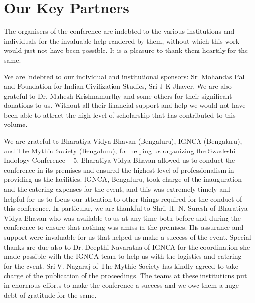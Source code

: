 
\chapter*{Our Key Partners}\label{keypartners}

\vspace{-.5cm}

The organisers of the conference are indebted to the various institutions and individuals for the invaluable help rendered by them, without which this work would just not have been possible. It is a pleasure to thank them heartily for the same.

We are indebted to our individual and institutional sponsors: Sri Mohandas Pai and Foundation for Indian Civilization Studies, Sri J K Jhaver. We are also grateful to Dr. Mahesh Krishnamurthy and some others for their significant donations to us. Without all their financial support and help we would not have been able to attract the high level of scholarship that has contributed to this volume.

We are grateful to Bharatiya Vidya Bhavan (Bengaluru), IGNCA (Bengaluru), and The Mythic Society (Bengaluru), for helping us organizing the Swadeshi Indology Conference – 5. Bharatiya Vidya Bhavan allowed us to conduct the conference in its premises and ensured the highest level of professionalism in providing us the facilities. IGNCA, Bengaluru, took charge of the inauguration and the catering expenses for the event, and this was extremely timely and helpful for us to focus our attention to other things required for the conduct of this conference. In particular, we are thankful to Shri. H. N. Suresh of Bharatiya Vidya Bhavan who was available to us at any time both before and during the conference to ensure that nothing was amiss in the premises. His assurance and support were invaluable for us that helped us make a success of the event. Special thanks are due also to Dr. Deepthi Navaratna of IGNCA for the coordination she made possible with the IGNCA team to help us with the logistics and catering for the event. Sri V. Nagaraj of The Mythic Society has kindly agreed to take charge of the publication of the proceedings. The teams at these institutions put in enormous efforts to make the conference a success and we owe them a huge debt of gratitude for the same. 

